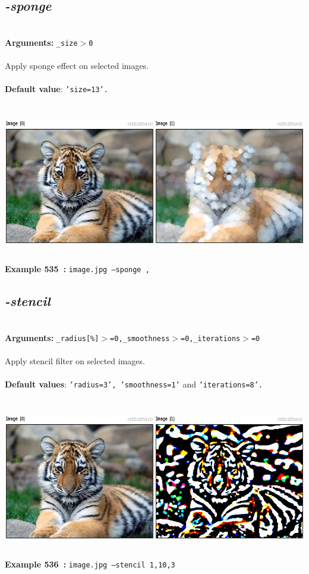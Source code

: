 \documentclass[a4paper,11pt,twoside]{book}
\begin{document}
\subsection{\emph{-sponge} }\vspace*{-0.5em}
~\\\textbf{Arguments: } 
{\small \texttt{\_size$>$0}}\\~\\
Apply sponge effect on selected images.
~\\~\\\textbf{Default value}: {\small \texttt{'size=13'.}}
\begin{center}\includegraphics[keepaspectratio=true,height=7cm,width=\textwidth]{img/gmic_def535.jpg}\\
{\footnotesize \textbf{Example 535~:} \texttt{image.jpg --sponge ,}}
\end{center}

\subsection{\emph{-stencil} }\vspace*{-0.5em}
~\\\textbf{Arguments: } 
{\small \texttt{\_radius[\%]$>$=0,\_smoothness$>$=0,\_iterations$>$=0}}\\~\\
Apply stencil filter on selected images.
~\\~\\\textbf{Default values}: {\small \texttt{'radius=3', 'smoothness=1'} and \texttt{'iterations=8'.}}
\begin{center}\includegraphics[keepaspectratio=true,height=7cm,width=\textwidth]{img/gmic_def536.jpg}\\
{\footnotesize \textbf{Example 536~:} \texttt{image.jpg --stencil 1,10,3}}
\end{center}
\end{document}
